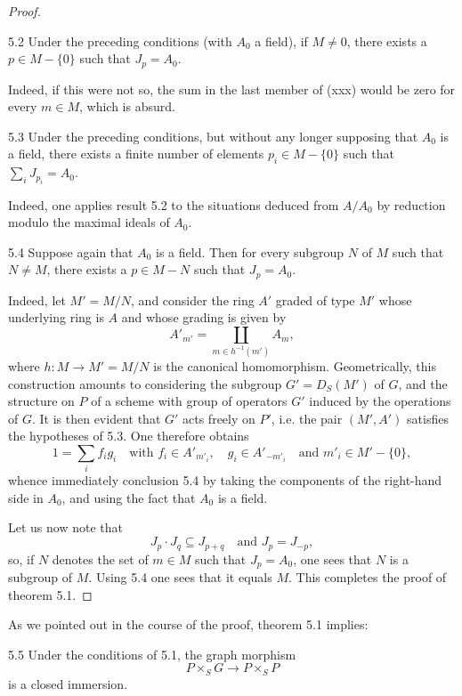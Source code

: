 \begin{proof}
\begin{lemma}{5.2}\label{VIII.5.2}
Under the preceding conditions (with $A_0$ a field), if $M\ne0$, there exists a $p\in M-\{0\}$ such that $J_p=A_0$.
\end{lemma}
Indeed, if this were not so, the sum in the last member of (xxx) would be zero for every $m\in M$, which is absurd.
\begin{corollary}{5.3}\label{VIII.5.3}
Under the preceding conditions, but without any longer supposing that $A_0$ is a field, there exists a finite number of elements $p_i\in M-\{0\}$ such that $\sum_i J_{p_i}=A_0$.
\end{corollary}
Indeed, one applies result 5.2 to the situations deduced from $A/A_0$ by reduction modulo the maximal ideals of $A_0$.
\begin{corollary}{5.4}\label{VIII.5.4}
Suppose again that $A_0$ is a field. Then for every subgroup $N$ of $M$ such that $N\ne M$, there exists a $p\in M-N$ such that $J_p=A_0$.
\end{corollary}
Indeed, let $M'=M/N$, and consider the ring $A'$ graded of type $M'$ whose underlying ring is $A$ and whose grading is given by
\[
A'_{m'}=\coprod_{m\in h^{-1}(m')}A_m,
\]
where $h:M\to M'=M/N$ is the canonical homomorphism. Geometrically, this construction amounts to considering the subgroup $G'=D_S(M')$ of $G$, and the structure on $P$ of a scheme with group of operators $G'$ induced by the operations of $G$. It is then evident that $G'$ acts freely on $P'$, i.e. the pair $(M',A')$ satisfies the hypotheses of 5.3. One therefore obtains
\[
1=\sum_i f_ig_i\quad\text{with }f_i\in A'_{m'_i},\quad g_i\in A'_{-m'_i}\quad\text{and }m'_i\in M'-\{0\},
\]
whence immediately conclusion 5.4 by taking the components of the right-hand side in $A_0$, and using the fact that $A_0$ is a field.

Let us now note that
\[
J_p\cdot J_q\subseteq J_{p+q}\quad\text{and }J_p=J_{-p},
\]
so, if $N$ denotes the set of $m\in M$ such that $J_p=A_0$, one sees that $N$ is a subgroup of $M$. Using 5.4 one sees that it equals $M$. This completes the proof of theorem 5.1.
\end{proof}
As we pointed out in the course of the proof, theorem 5.1 implies:
\begin{corollary}{5.5}\label{VIII.5.5}
Under the conditions of 5.1, the graph morphism
\[
P\times_S G\to P\times_S P
\]
is a closed immersion.
\end{corollary}

